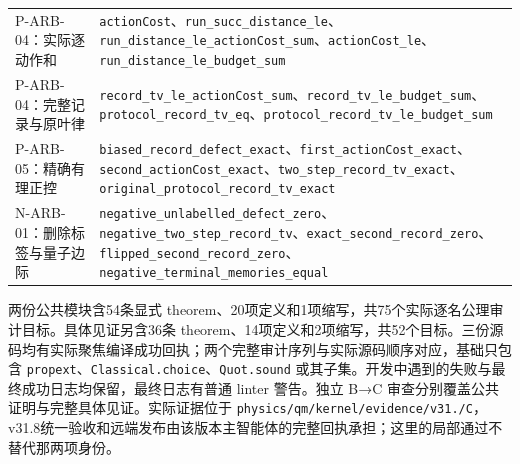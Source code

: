 \documentclass[
  11pt,
  oneside]{book}
\begin{document}
\begin{longtable}[]{@{}
  >{\raggedright\arraybackslash}p{}
  >{\raggedright\arraybackslash}p{}@{}}
P-ARB-04：实际逐动作和 &
\texttt{action\allowbreak Cost}、\allowbreak \texttt{run\_\allowbreak succ\_\allowbreak distance\_\allowbreak le}、\allowbreak \texttt{run\_\allowbreak distance\_\allowbreak le\_\allowbreak action\allowbreak Cost\_\allowbreak sum}、\allowbreak \texttt{action\allowbreak Cost\_\allowbreak le}、\allowbreak \texttt{run\_\allowbreak distance\_\allowbreak le\_\allowbreak budget\_\allowbreak sum} \\
P-ARB-04：完整记录与原叶律 &
\texttt{record\_\allowbreak tv\_\allowbreak le\_\allowbreak action\allowbreak Cost\_\allowbreak sum}、\allowbreak \texttt{record\_\allowbreak tv\_\allowbreak le\_\allowbreak budget\_\allowbreak sum}、\allowbreak \texttt{protocol\_\allowbreak record\_\allowbreak tv\_\allowbreak eq}、\allowbreak \texttt{protocol\_\allowbreak record\_\allowbreak tv\_\allowbreak le\_\allowbreak budget\_\allowbreak sum} \\
P-ARB-05：精确有理正控 &
\texttt{biased\_\allowbreak record\_\allowbreak defect\_\allowbreak exact}、\allowbreak \texttt{first\_\allowbreak action\allowbreak Cost\_\allowbreak exact}、\allowbreak \texttt{second\_\allowbreak action\allowbreak Cost\_\allowbreak exact}、\allowbreak \texttt{two\_\allowbreak step\_\allowbreak record\_\allowbreak tv\_\allowbreak exact}、\allowbreak \texttt{original\_\allowbreak protocol\_\allowbreak record\_\allowbreak tv\_\allowbreak exact} \\
N-ARB-01：删除标签与量子边际 &
\texttt{negative\_\allowbreak unlabelled\_\allowbreak defect\_\allowbreak zero}、\allowbreak \texttt{negative\_\allowbreak two\_\allowbreak step\_\allowbreak record\_\allowbreak tv}、\allowbreak \texttt{exact\_\allowbreak second\_\allowbreak record\_\allowbreak zero}、\allowbreak \texttt{flipped\_\allowbreak second\_\allowbreak record\_\allowbreak zero}、\allowbreak \texttt{negative\_\allowbreak terminal\_\allowbreak memories\_\allowbreak equal} \\
\end{longtable}

两份公共模块含54条显式
theorem、20项定义和1项缩写，共75个实际逐名公理审计目标。具体见证另含36条
theorem、14项定义和2项缩写，共52个目标。三份源码均有实际聚焦编译成功回执；两个完整审计序列与实际源码顺序对应，基础只包含
\texttt{propext}、\allowbreak \texttt{Classical.\allowbreak choice}、\allowbreak \texttt{Quot.\allowbreak sound}
或其子集。开发中遇到的失败与最终成功日志均保留，最终日志有普通 linter
警告。独立 B→C 审查分别覆盖公共证明与完整具体见证。实际证据位于
\texttt{physics/\allowbreak qm/\allowbreak kernel/\allowbreak evidence/\allowbreak v31./\allowbreak C}，v31.8统一验收和远端发布由该版本主智能体的完整回执承担；这里的局部通过不替代那两项身份。
\end{document}
